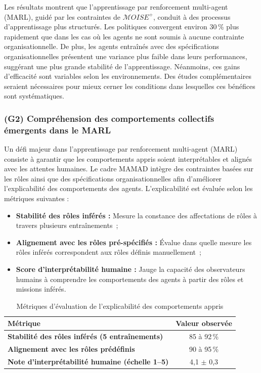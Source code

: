 Les résultats montrent que l'apprentissage par renforcement multi-agent (MARL), guidé par les contraintes de $\mathcal{M}OISE^+$, conduit à des processus d'apprentissage plus structurés. Les politiques convergent environ 30\,\% plus rapidement que dans les cas où les agents ne sont soumis à aucune contrainte organisationnelle. De plus, les agents entraînés avec des spécifications organisationnelles présentent une variance plus faible dans leurs performances, suggérant une plus grande stabilité de l'apprentissage. Néanmoins, ces gains d'efficacité sont variables selon les environnements. Des études complémentaires seraient nécessaires pour mieux cerner les conditions dans lesquelles ces bénéfices sont systématiques.
\subsubsection{(G2) Compréhension des comportements collectifs émergents dans le MARL}

Un défi majeur dans l'apprentissage par renforcement multi-agent (MARL) consiste à garantir que les comportements appris soient interprétables et alignés avec les attentes humaines. Le cadre MAMAD intègre des contraintes basées sur les rôles ainsi que des spécifications organisationnelles afin d'améliorer l'explicabilité des comportements des agents. L'explicabilité est évaluée selon les métriques suivantes :

\begin{itemize}
    \item \textbf{Stabilité des rôles inférés :} Mesure la constance des affectations de rôles à travers plusieurs entraînements~;
    \item \textbf{Alignement avec les rôles pré-spécifiés :} Évalue dans quelle mesure les rôles inférés correspondent aux rôles définis manuellement~;
    \item \textbf{Score d'interprétabilité humaine :} Jauge la capacité des observateurs humains à comprendre les comportements des agents à partir des rôles et missions inférés.
\end{itemize}

\begin{table}[h!]
    \centering
    \caption{Métriques d'évaluation de l'explicabilité des comportements appris}
    \begin{tabular}{lc}
        \hline
        \textbf{Métrique}                                      & \textbf{Valeur observée} \\
        \hline
        \textbf{Stabilité des rôles inférés (5 entraînements)} & 85 à 92\,\%              \\
        \hline
        \textbf{Alignement avec les rôles prédéfinis}          & 90 à 95\,\%              \\
        \hline
        \textbf{Note d'interprétabilité humaine (échelle 1–5)} & 4{,}1 $\pm$ 0{,}3        \\
        \hline
    \end{tabular}
    \label{tab:explainability}
\end{table}

